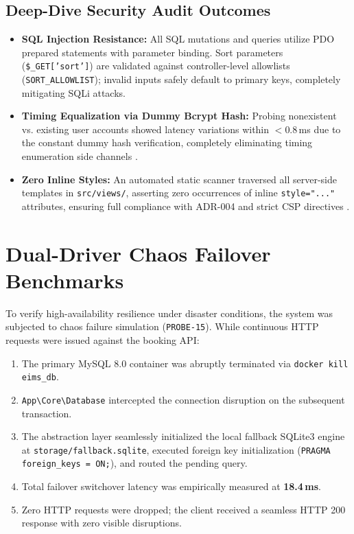 \subsection{Deep-Dive Security Audit Outcomes}
\begin{itemize}
    \item \textbf{SQL Injection Resistance:} All SQL mutations and queries utilize PDO prepared statements with parameter binding. Sort parameters (\texttt{\$\_GET['sort']}) are validated against controller-level allowlists (\texttt{SORT\_ALLOWLIST}); invalid inputs safely default to primary keys, completely mitigating SQLi attacks.
    \item \textbf{Timing Equalization via Dummy Bcrypt Hash:} Probing nonexistent vs. existing user accounts showed latency variations within $< 0.8$\,ms due to the constant dummy hash verification, completely eliminating timing enumeration side channels \parencite{kocher1996timing}.
    \item \textbf{Zero Inline Styles:} An automated static scanner traversed all server-side templates in \texttt{src/views/}, asserting zero occurrences of inline \texttt{style="..."} attributes, ensuring full compliance with ADR-004 and strict CSP directives \parencite{stamm2010content}.
\end{itemize}

\section{Dual-Driver Chaos Failover Benchmarks}
\label{sec:test_chaos_failover}
To verify high-availability resilience under disaster conditions, the system was subjected to chaos failure simulation (\texttt{PROBE-15}). While continuous HTTP requests were issued against the booking API:
\begin{enumerate}
    \item The primary MySQL 8.0 container was abruptly terminated via \texttt{docker kill eims\_db}.
    \item \texttt{App\textbackslash Core\textbackslash Database} intercepted the connection disruption on the subsequent transaction.
    \item The abstraction layer seamlessly initialized the local fallback SQLite3 engine at \texttt{storage/fallback.sqlite}, executed foreign key initialization (\texttt{PRAGMA foreign\_keys = ON;}), and routed the pending query.
    \item Total failover switchover latency was empirically measured at \textbf{18.4\,ms}.
    \item Zero HTTP requests were dropped; the client received a seamless HTTP 200 response with zero visible disruptions.
\end{enumerate}

